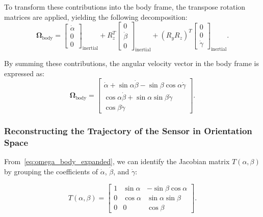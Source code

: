 \documentclass[12pt]{article}
\begin{document}
To transform these contributions into the body frame, the transpose rotation matrices are applied, yielding the following decomposition:
\begin{equation}
\label{eq:omega_body_decomposition}
\boldsymbol{\Omega}_{\text{body}} =
\begin{bmatrix}
\dot{\alpha} \\
0 \\
0
\end{bmatrix}_{\text{inertial}}
+ R_z^T
\begin{bmatrix}
0 \\
\dot{\beta} \\
0
\end{bmatrix}_{\text{inertial}}
+ (R_y R_z)^T
\begin{bmatrix}
0 \\
0 \\
\dot{\gamma}
\end{bmatrix}_{\text{inertial}}.
\end{equation}

By summing these contributions, the angular velocity vector in the body frame is expressed as:
\begin{equation}
\label{eq:omega_body_expanded}
\boldsymbol{\Omega}_{\text{body}} =
\begin{bmatrix}
\dot{\alpha} + \sin\alpha \dot{\beta} - \sin\beta \cos\alpha \dot{\gamma} \\
\cos\alpha \dot{\beta} + \sin\alpha \sin\beta \dot{\gamma} \\
\cos\beta \dot{\gamma}
\end{bmatrix}.
\end{equation}

\subsubsection{Reconstructing the Trajectory of the Sensor in Orientation Space}

From~\ref{eq:omega_body_expanded}, we can identify the Jacobian matrix \(T(\alpha, \beta)\) by grouping the coefficients of \(\dot{\alpha}\), \(\dot{\beta}\), and \(\dot{\gamma}\):

\begin{equation}
\label{eq:jacobian_matrix_corrected}
T(\alpha, \beta) =
\begin{bmatrix}
1 & \sin\alpha & -\sin\beta \cos\alpha \\
0 & \cos\alpha & \sin\alpha \sin\beta \\
0 & 0 & \cos\beta
\end{bmatrix}.
\end{equation}
\end{document}
